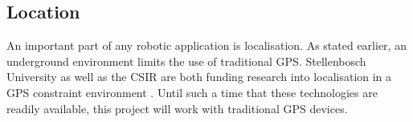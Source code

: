 %			
%			
%			
		
		
			\subsection{Location}
			An important part of any robotic application is localisation. As stated earlier, an underground environment limits the use of traditional GPS. Stellenbosch University as well as the CSIR are both funding research into localisation in a GPS constraint environment . Until such a time that these technologies are readily available, this project will work with traditional GPS devices.
			
